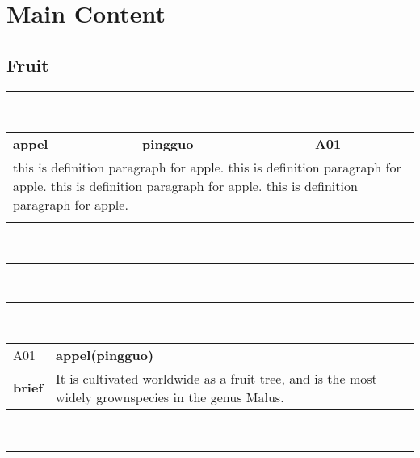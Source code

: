 \section*{\centering Main Content}
\subsection{Fruit}
\vspace{-10pt}
\rule{\textwidth}{0.8mm} \\[0.2cm]
\begin{tabularx}{\textwidth}{llX}
    \large{\bfseries{appel}}&
    \bfseries{pingguo}&
    \hfill\bfseries{A01}\\[10pt]
	\multicolumn{3}{l}{\noindent\parbox[c]{\hsize}{this is definition paragraph for apple. this is definition paragraph for apple.
this is definition paragraph for apple. this is definition paragraph for apple.}} \\ \hdashline

\end{tabularx}
\\[5pt]
\rule{\textwidth}{0.8mm} \\[-8pt]
\rule{\textwidth}{0.8mm} \\[0.2cm]
\begin{tabularx}{\textwidth}{llX}
    \small{A0}1&\large{\bfseries{appel(pingguo)}}\\[10pt]
    \large{\bfseries{brief}}&\noindent\parbox[c]{\hsize}{It is cultivated worldwide as a fruit tree, and is the most widely grownspecies in the genus Malus.} \\
\end{tabularx}
\vspace{0pt}\\
\rule{\textwidth}{0.8mm} \\[1pt]
